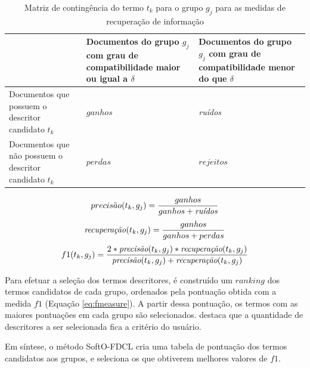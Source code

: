 \begin{table}[!htp]
  \centering
  \begin{tabular}{ |p{5cm}|p{5cm}|p{5cm}|}
    \cline{2-3}
    \multicolumn{1}{p{5cm}|}{} & Documentos do grupo $g_j$ com grau de compatibilidade 
    maior ou igual a $\delta$ &
    Documentos do grupo $g_j$ com grau de compatibilidade menor do que $\delta$ \\
    \hline
    Documentos que possuem o descritor candidato $t_k$ & \parbox[c]{5cm}{\centering $ganhos$} &
    \parbox[c]{5cm}{\centering \it ruídos\/} \\
    \hline
    Documentos que não possuem o descritor candidato $t_k$ & \parbox[c]{5cm}{\centering $perdas$} &
    \parbox[c]{5cm}{\centering $rejeitos$} \\
    \hline
  \end{tabular}
  \caption{Matriz de contingência do termo $t_k$ para o grupo $g_j$ para as medidas de recuperação
  de informação}
  \label{table:softmatrix}
\end{table}

\begin{equation}
  precis\tilde{a}o(t_k,g_j) = \frac{ganhos}{ganhos + \text{\it ruídos}}
  \label{eq:precision}
\end{equation}
\begin{equation}
  \text{\it recuperação\/}(t_k,g_j) = \frac{ganhos}{ganhos + perdas}
  \label{eq:recall}
\end{equation}
\begin{equation}
  f1(t_k,g_j) = \frac{2 * \text{\it precisão}(t_k,g_j) * \text{\it recuperação}(t_k,g_j)}
  {\text{\it precisão}(t_k,g_j) + \text{\it recuperação}(t_k,g_j)}
  \label{eq:fmeasure}
\end{equation}

Para efetuar a seleção dos termos descritores, é construído um $ranking$ dos termos candidatos de
cada grupo, ordenados pela pontuação obtida com a medida $f1$ (Equação \ref{eq:fmeasure}). A partir
dessa pontuação, os termos com as maiores pontuações em cada grupo são selecionados.
 destaca que a quantidade de descritores a ser selecionada fica a critério
do usuário.

Em síntese, o método SoftO-FDCL cria uma tabela de pontuação dos termos candidatos aos grupos,
e seleciona os que obtiverem melhores valores de $f1$.  

